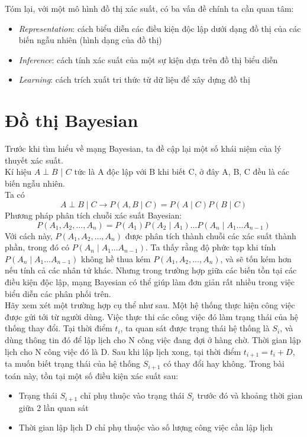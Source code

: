\documentclass{my_style}
\begin{document}
Tóm lại, với một mô hình đồ thị xác suất, có ba vấn đề chính ta cần quan tâm: 
\begin{itemize}
	\item \textit{Representation}: cách biểu diễn các điều kiện độc lập dưới dạng đồ thị của các biến ngẫu nhiên (hình dạng của đồ thị)
	\item \textit{Inference}: cách tính xác suất của một sự kiện dựa trên đồ thị biểu diễn
	\item \textit{Learning}: cách trích xuất tri thức từ dữ liệu để xây dựng đồ thị
\end{itemize}
\section{Đồ thị Bayesian}
Trước khi tìm hiểu về mạng Bayesian, ta đề cập lại một số khái niệm của lý thuyết xác suất. \\
Kí hiệu $A \perp B$ | $C$ tức là A độc lập với B khi biết C, ở đây A, B, C đều là các biến ngẫu nhiên. \\
Ta có 
\[
	A \perp B \mid C \rightarrow P(A,B \mid C) = P(A \mid C)P(B \mid C)
\]
Phương pháp phân tích chuỗi xác suất Bayesian: 
\[
	P(A_{1}, A_{2}, ..., A_{n}) = P(A_{1})P(A_{2} \mid A_{1}) ... P(A_{n} \mid A_{1} ... A_{n-1})
\]
Với cách này, $P(A_{1}, A_{2}, ..., A_{n})$ được phân tích thành chuỗi các xác suất thành phần, trong đó có $P(A_{n} \mid A_{1} ... A_{n-1})$. Ta thấy rằng độ phức tạp khi tính $P(A_{n} \mid A_{1} ... A_{n-1})$ không hề thua kém $P(A_{1}, A_{2}, ..., A_{n})$, và sẽ tốn kém hơn nếu tính cả các nhân tử khác. Nhưng trong trường hợp giữa các biến tồn tại các điều kiện độc lập, mạng Bayesian có thể giúp làm đơn giản rất nhiều trong việc biểu diễn các phân phối trên.\\
Hãy xem xét một trường hợp cụ thể như sau. Một hệ thống thực hiện công việc được gửi tới từ người dùng. 
Việc thực thi các công việc đó làm trạng thái của hệ thống thay đổi. Tại thời điểm $t_{i}$, ta quan sát được trạng thái hệ thống là $S_{i}$, và dùng thông tin đó để lập lịch cho N công việc đang đợi ở hàng chờ. Thời gian lập lịch cho N công việc đó là D. Sau khi lập lịch xong, tại thời điểm $t_{i + 1} = t_{i} + D$, ta muốn biết trạng thái của hệ thống $S_{i+1}$ có thay đổi hay không. Trong bài toán này, tồn tại một số điều kiện xác suất sau: 
\begin{itemize}
	\item Trạng thái $S_{i+1}$ chỉ phụ thuộc vào trạng thái $S_{i}$ trước đó và khoảng thời gian giữa 2 lần quan sát 
	\item Thời gian lập lịch D chỉ phụ thuộc vào số lượng công việc cần lập lịch 
\end{itemize}
 
\end{document}
